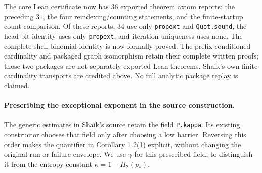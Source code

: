The core Lean certificate now has \(36\) exported theorem axiom reports:
the preceding \(31\), the four reindexing/counting statements, and the
finite-startup count comparison. Of these reports, \(34\) use only
\texttt{propext} and \texttt{Quot.sound}, the head-bit identity uses
only \texttt{propext}, and iteration uniqueness uses none.
The complete-shell binomial identity is now formally proved.
The prefix-conditioned cardinality and packaged graph isomorphism retain
their complete written proofs; those two packages are not separately
exported Lean theorems. Shaik's own finite cardinality transports are
credited above. No full analytic package replay is claimed.

\paragraph{Prescribing the exceptional exponent in the source construction.}
The generic estimates in Shaik's source retain the field
\texttt{P.kappa}. Its existing constructor chooses that field only after
choosing a low barrier. Reversing this order makes the quantifier in
Corollary 1.2(1) explicit, without changing the original run or failure
envelope. We use \(\gamma\) for this prescribed field, to distinguish it
from the entropy constant \(\kappa=1-H_2(p_*)\).

